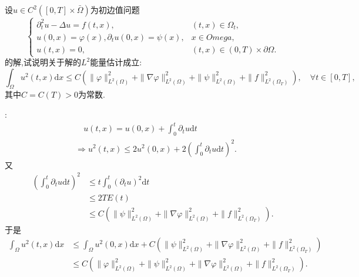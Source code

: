 \documentclass[12pt, a4paper]{ctexbook}
\newcommand{\dx}{\text{d}x}
\newcommand{\dt}{\text{d}t}
\begin{document}
    设$u\in C^2([0, T]\times \bar\Omega)$为初边值问题
    $$\begin{cases}
    \partial_t^2u - \Delta u  = f(t,x), & (t, x)  \in\Omega_t,\\
    u(0, x) = \varphi(x), \partial_t u(0,x) = \psi(x), & x \in Omega,\\
    u(t,x) = 0, & (t,x)\in (0, T )\times\partial\Omega.
    \end{cases}$$
    的解,试说明关于解的$L^2$能量估计成立:
    $$\int_\Omega u^2(t,x)\dx \leq C (\|\varphi\|^2_{L^2(\Omega)} +  \|\nabla \varphi\|^2_{L^2(\Omega)} + \|\psi\|^2_{L^2(\Omega)} + \|f\|^2_{L^2(\Omega_T)}), \quad \forall t \in [0, T],$$
    其中$C = C(T) > 0 $为常数.
    
    \songti{}:\\
    
    \begin{align*}
    &\quad u(t,x) = u(0,x) + \int_0^t \partial_t u \dt\\
    &\Rightarrow u^2(t,x) \le 2u^2(0,x)+2\left(\int_0^t \partial_t u \dt\right)^2.
    \end{align*}
    又
    \begin{align*}
    \left(\int_0^t \partial_t u \dt\right)^2 &\le t\int_0^t \left(\partial_t u\right)^2 \dt\\
    &\le 2TE(t)\\
    &\le C\left(\|\psi\|^2_{L^2(\Omega)} + \|\nabla \varphi\|^2_{L^2(\Omega)}  + \|f\|^2_{L^2(\Omega_T)} \right).
    \end{align*}
    于是
    \begin{align*}
    \int_{\Omega}u^2(t,x)\dx &\le \int_{\Omega}u^2(0,x)\dx + C\left(\|\psi\|^2_{L^2(\Omega)} + \|\nabla \varphi\|^2_{L^2(\Omega)}  + \|f\|^2_{L^2(\Omega_T)} \right)\\
    &\le C\left(\|\varphi\|^2_{L^2(\Omega)}+\|\psi\|^2_{L^2(\Omega)} + \|\nabla \varphi\|^2_{L^2(\Omega)}  + \|f\|^2_{L^2(\Omega_T)} \right).
    \end{align*}
    

    
\end{document}
